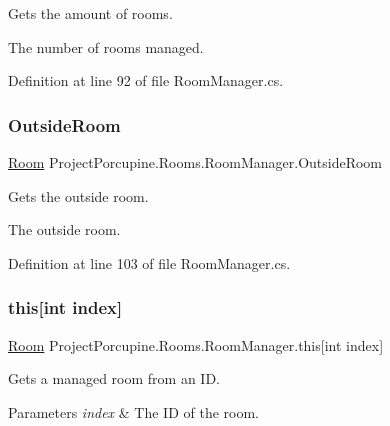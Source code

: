 Gets the amount of rooms. 

The number of rooms managed.

Definition at line 92 of file Room\+Manager.\+cs.

\mbox{\label{class_project_porcupine_1_1_rooms_1_1_room_manager_adc67244d6abd3955beb780d4add7bbac}} 
\subsubsection{\texorpdfstring{Outside\+Room}{OutsideRoom}}
{\footnotesize\ttfamily \hyperlink{class_project_porcupine_1_1_rooms_1_1_room}{Room} Project\+Porcupine.\+Rooms.\+Room\+Manager.\+Outside\+Room\hspace{0.3cm}{\ttfamily [get]}}



Gets the outside room. 

The outside room.

Definition at line 103 of file Room\+Manager.\+cs.

\mbox{\label{class_project_porcupine_1_1_rooms_1_1_room_manager_a6763abd4726b4dd98bb2fcb89484b31e}} 
\subsubsection{\texorpdfstring{this[int index]}{this[int index]}}
{\footnotesize\ttfamily \hyperlink{class_project_porcupine_1_1_rooms_1_1_room}{Room} Project\+Porcupine.\+Rooms.\+Room\+Manager.\+this\mbox{[}int index\mbox{]}\hspace{0.3cm}{\ttfamily [get]}}



Gets a managed room from an ID. 


\begin{DoxyParams}{Parameters}
{\em index} & The ID of the room.\\
\hline
\end{DoxyParams}


